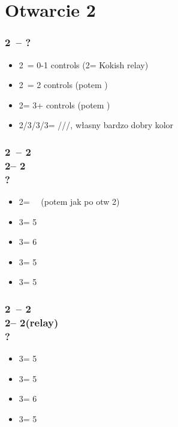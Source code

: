 \documentclass[12pt, a4paper]{report}
\begin{document}
\section*{\colorbox{blue!30}{Otwarcie 2\clubs}}
 {

    \subsubsection*{2\clubs\ -- ?}
    \begin{itemize}
        \item 2\diams\ = 0-1 controls (2\hearts = Kokish relay)
        \item 2\hearts\ = 2 controls (potem \nat)
        \item 2\spades = 3+ controls (potem \nat)
        \item 2\nt/3\clubs/3\diams/3\hearts = \clubs/\diams/\hearts/\spades, własny bardzo dobry kolor
    \end{itemize}

    \subsubsection*{2\clubs\ -- 2\diams\\
                2\hearts -- 2\spades\\
                ?}
    \begin{itemize}
        \item 2\nt = \nf\ \bal\ (potem jak po otw 2\nt)
        \item 3\clubs = 5\diams
        \item 3\diams = 6\hearts
        \item 3\hearts = 5\spades
        \item 3\spades = 5\clubs
    \end{itemize}

    \subsubsection*{2\clubs\ -- 2\diams\\
                2\spades -- 2\nt (relay)\\
                ?}
    \begin{itemize}
        \item 3\clubs = 5\diams
        \item 3\diams = 5\hearts
        \item 3\hearts = 6\spades
        \item 3\spades = 5\clubs
    \end{itemize}

}
\end{document}
